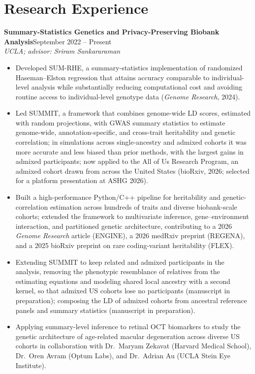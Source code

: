 \documentclass[10pt,letterpaper]{article}
\newcommand{\entry}[4]{\noindent\textbf{#1}\hfill #2\\ {\itshape #3}\hfill #4\par}
\begin{document}
\section{Research Experience}
\entry{Summary-Statistics Genetics and Privacy-Preserving Biobank Analysis}{September 2022 -- Present}{UCLA; advisor: Sriram Sankararaman}{}
\begin{itemize}
\item Developed SUM-RHE, a summary-statistics implementation of randomized Haseman--Elston regression that attains accuracy comparable to individual-level analysis while substantially reducing computational cost and avoiding routine access to individual-level genotype data (\emph{Genome Research}, 2024).
\item Led SUMMIT, a framework that combines genome-wide LD scores, estimated with random projections, with GWAS summary statistics to estimate genome-wide, annotation-specific, and cross-trait heritability and genetic correlation; in simulations across single-ancestry and admixed cohorts it was more accurate and less biased than prior methods, with the largest gains in admixed participants; now applied to the All of Us Research Program, an admixed cohort drawn from across the United States (bioRxiv, 2026; selected for a platform presentation at ASHG 2026).
\item Built a high-performance Python/C++ pipeline for heritability and genetic-correlation estimation across hundreds of traits and diverse biobank-scale cohorts; extended the framework to multivariate inference, gene--environment interaction, and partitioned genetic architecture, contributing to a 2026 \emph{Genome Research} article (ENGINE), a 2026 medRxiv preprint (REGENA), and a 2025 bioRxiv preprint on rare coding-variant heritability (FLEX).
\item Extending SUMMIT to keep related and admixed participants in the analysis, removing the phenotypic resemblance of relatives from the estimating equations and modeling shared local ancestry with a second kernel, so that admixed US cohorts lose no participants (manuscript in preparation); composing the LD of admixed cohorts from ancestral reference panels and summary statistics (manuscript in preparation).
\item Applying summary-level inference to retinal OCT biomarkers to study the genetic architecture of age-related macular degeneration across diverse US cohorts in collaboration with Dr.\ Maryam Zekavat (Harvard Medical School), Dr.\ Oren Avram (Optum Labs), and Dr.\ Adrian Au (UCLA Stein Eye Institute).
\end{itemize}
\end{document}
